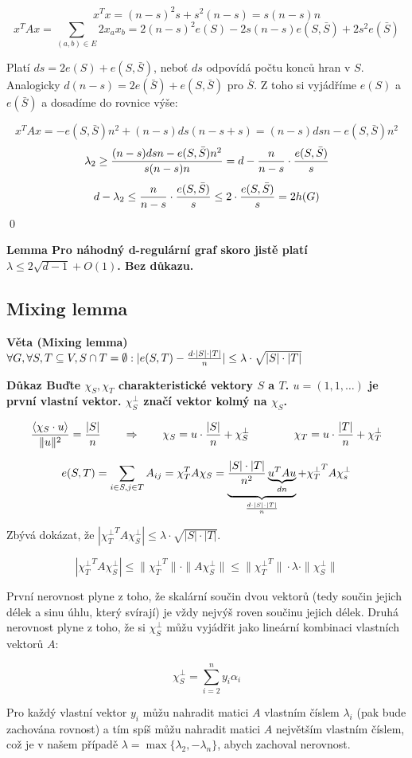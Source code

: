 \documentclass[a4paper,12pt,titlepage]{article}
\newcommand{\lm}{\smallskip\noindent\bf Lemma\rm{} }
\newcommand{\dk}{\smallskip\noindent\bf Důkaz\rm{} }
\newcommand{\vt}{\smallskip\noindent\bf Věta\rm{} }
\newcommand{\xttt}{{\chi_T^\bot}^T}
\newcommand{\sk}[1]{\langle #1\rangle}
\begin{document}
$$x^Tx = (n-s)^2s + s^2(n-s) = s(n-s)n$$
$$x^TAx = \sum_{(a,b)\in E} 2x_ax_b = 2(n-s)^2e(S)-2s(n-s)e(S,\bar S) + 2s^2e(\bar S)$$

Platí $ds = 2e(S) + e(S,\bar S)$, neboť $ds$ odpovídá počtu konců hran v $S$. Analogicky $d(n-s) = 2e(\bar S) + e(S,\bar S)$ pro $\bar S$. Z toho si vyjádříme $e(S)$ a $e(\bar S)$ a dosadíme do rovnice výše:

$$x^TAx = -e(S,\bar S)n^2 + (n-s)ds(n-s+s) = (n-s)dsn - e(S,\bar S)n^2$$
$$\lambda_2 \ge {(n-s)dsn - e(S,\bar S)n^2 \over s(n-s)n} = d - {n\over n-s}\cdot{e(S,\bar S)\over s}$$
$$d-\lambda_2 \le {n\over n-s} \cdot {e(S,\bar S)\over s} \le 2\cdot{e(S,\bar S)\over s} = 2h(G)$$
\qed

\lm Pro náhodný d-regulární graf skoro jistě platí $\lambda \le 2\sqrt{d-1} + O(1)$. Bez důkazu.

\subsection{Mixing lemma}
\vt (Mixing lemma) $\forall G, \forall S,T \subseteq V, S\cap T = \emptyset: |e(S,T) - {d\cdot|S|\cdot|T|\over n}| \le \lambda\cdot\sqrt{|S|\cdot|T|}$

\dk Buďte $\chi_S, \chi_T$ charakteristické vektory $S$ a $T$. $u = (1,1,\dots)$ je první vlastní vektor. $\chi_S^\bot$ značí vektor kolmý na $\chi_S$.

$${\sk{\chi_S \cdot u} \over \|u\|^2} = {|S|\over n} \qquad\Rightarrow\qquad \chi_S = u\cdot {|S|\over n} + \chi_S^\bot \qquad\qquad \chi_T = u\cdot {|T|\over n} + \chi_T^\bot$$

$$e(S,T) = \sum_{i\in S, j\in T} A_{ij} = \chi_T^TA\chi_S = \underbrace{{|S|\cdot |T| \over n^2} \underbrace{u^TAu}_{dn}}_{d\cdot |S|\cdot |T|\over n} + \xttt A\chi_s^\bot$$

Zbývá dokázat, že $|\xttt A\chi_S^\bot| \le \lambda\cdot\sqrt{|S|\cdot |T|}$.

$$|\xttt A\chi_S^\bot| \le \|\xttt \| \cdot \|A\chi_S^\bot\| \le \|\xttt\|\cdot\lambda\cdot\|\chi_S^\bot\|$$

První nerovnost plyne z toho, že skalární součin dvou vektorů (tedy součin
jejich délek a sinu úhlu, který svírají) je vždy nejvýš roven součinu jejich
délek. Druhá nerovnost plyne z toho, že si $\chi_S^\bot$ můžu vyjádřit jako
lineární kombinaci vlastních vektorů $A$:

$$\chi_S^\bot = \sum_{i=2}^n y_i\alpha_i$$

Pro každý vlastní vektor $y_i$ můžu nahradit matici $A$ vlastním číslem
$\lambda_i$ (pak bude zachována rovnost) a tím spíš můžu nahradit matici $A$
největším vlastním číslem, což je v našem případě $\lambda =
\max\{\lambda_2,-\lambda_n\}$, abych zachoval nerovnost.
\end{document}
